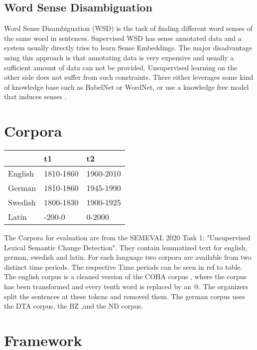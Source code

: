 \documentclass[11pt]{article}
\begin{document}
\subsection{Word Sense Disambiguation}

Word Sense Disambiguation (WSD) is the task of finding different word senses of the same word in sentences.
Supervised WSD has sense annotated data and a system usually directly tries to learn
Sense Embeddings. 
The major disadvantage using this approach is that annotating data is very expensive and usually a sufficient amount of data can not be provided. \newline
Unsupervised learning on the other side does not suffer from such constraints. There either leverages 
some kind of knowledge base such as BabelNet or WordNet, or use a knowledge free model that induces senses \cite{panchenko2017unsupervised}.

\section{Corpora}

\begin{table}[h!]
  \label{corpora_epochs}
  \begin{tabular}{|l|l|l|}
  \hline
          & t1        & t2        \\ \hline
  English & 1810-1860 & 1960-2010 \\ \hline
  German  & 1810-1860 & 1945-1990 \\ \hline
  Swedish & 1800-1830 & 1900-1925 \\ \hline
  Latin   & -200-0    & 0-2000    \\ \hline
  \end{tabular}
\end{table}

The Corpora for evaluation are from the SEMEVAL 2020 Task 1: "Unsupervised Lexical Semantic Change Detection".
They contain lemmatized text for english, german, swedish and latin. For each language two corpora are available from two distinct time periods.
The respective Time periods can be seen in ref to table. The english corpus is a cleaned version of the COHA corpus \cite{davies2002corpus}, 
where the corpus has been transformed and every tenth word is replaced by an @. The organizers split the sentences at these tokens and removed them.
The german corpus uses the DTA corpus, the BZ ,and the ND corpus. 

\section{Framework}
\end{document}
